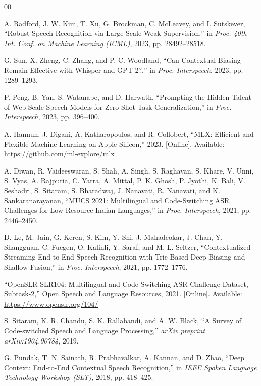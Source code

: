 \documentclass[conference]{IEEEtran}
\begin{document}
\begin{thebibliography}{00}

A. Radford, J. W. Kim, T. Xu, G. Brockman, C. McLeavey, and I. Sutskever,
``Robust Speech Recognition via Large-Scale Weak Supervision,'' in
\textit{Proc. 40th Int. Conf. on Machine Learning (ICML)}, 2023, pp. 28492--28518.

G. Sun, X. Zheng, C. Zhang, and P. C. Woodland, ``Can Contextual Biasing Remain
Effective with Whisper and GPT-2?,'' in \textit{Proc. Interspeech}, 2023,
pp. 1289--1293.

P. Peng, B. Yan, S. Watanabe, and D. Harwath, ``Prompting the Hidden Talent of
Web-Scale Speech Models for Zero-Shot Task Generalization,'' in
\textit{Proc. Interspeech}, 2023, pp. 396--400.

A. Hannun, J. Digani, A. Katharopoulos, and R. Collobert, ``MLX: Efficient and
Flexible Machine Learning on Apple Silicon,'' 2023. [Online]. Available:
\url{https://github.com/ml-explore/mlx}

A. Diwan, R. Vaideeswaran, S. Shah, A. Singh, S. Raghavan, S. Khare, V. Unni,
S. Vyas, A. Rajpuria, C. Yarra, A. Mittal, P. K. Ghosh, P. Jyothi, K. Bali,
V. Seshadri, S. Sitaram, S. Bharadwaj, J. Nanavati, R. Nanavati, and
K. Sankaranarayanan, ``MUCS 2021: Multilingual and Code-Switching ASR Challenges
for Low Resource Indian Languages,'' in \textit{Proc. Interspeech}, 2021,
pp. 2446--2450.

D. Le, M. Jain, G. Keren, S. Kim, Y. Shi, J. Mahadeokar, J. Chan, Y. Shangguan,
C. Fuegen, O. Kalinli, Y. Saraf, and M. L. Seltzer, ``Contextualized Streaming
End-to-End Speech Recognition with Trie-Based Deep Biasing and Shallow Fusion,''
in \textit{Proc. Interspeech}, 2021, pp. 1772--1776.

``OpenSLR SLR104: Multilingual and Code-Switching ASR Challenge Dataset,
Subtask-2,'' Open Speech and Language Resources, 2021. [Online]. Available:
\url{https://www.openslr.org/104/}

S. Sitaram, K. R. Chandu, S. K. Rallabandi, and A. W. Black, ``A Survey of
Code-switched Speech and Language Processing,'' \textit{arXiv preprint
arXiv:1904.00784}, 2019.

G. Pundak, T. N. Sainath, R. Prabhavalkar, A. Kannan, and D. Zhao, ``Deep
Context: End-to-End Contextual Speech Recognition,'' in \textit{IEEE Spoken
Language Technology Workshop (SLT)}, 2018, pp. 418--425.

\end{thebibliography}
\end{document}
